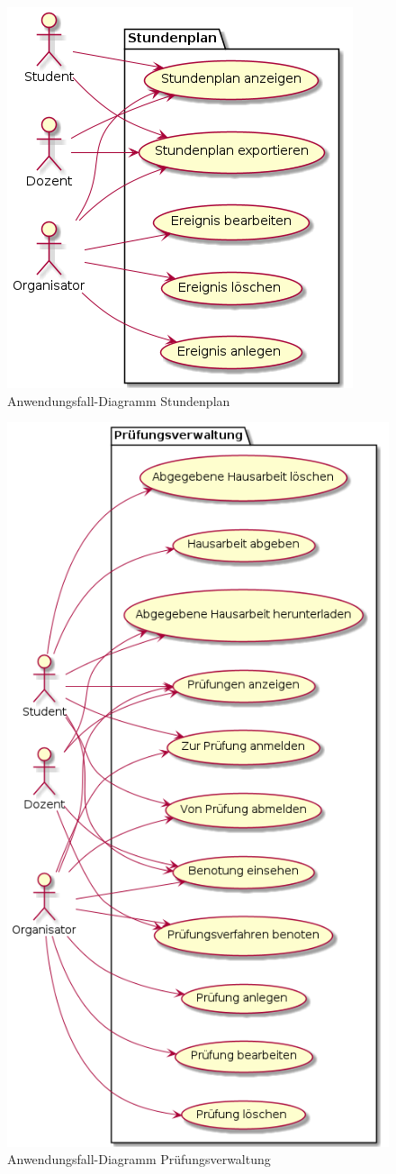 \documentclass[12pt, a4paper]{scrartcl}
\begin{document}
\begin{figure}[h]
	\centering
	\includegraphics[width=.6\textwidth]{usecase_sp.png}
	\caption{Anwendungsfall-Diagramm Stundenplan}
\end{figure}

\begin{figure}[h]
	\centering
	\includegraphics[width=.6\textwidth]{usecase_ex.png}
	\caption{Anwendungsfall-Diagramm Prüfungsverwaltung}
\end{figure}
\end{document}
